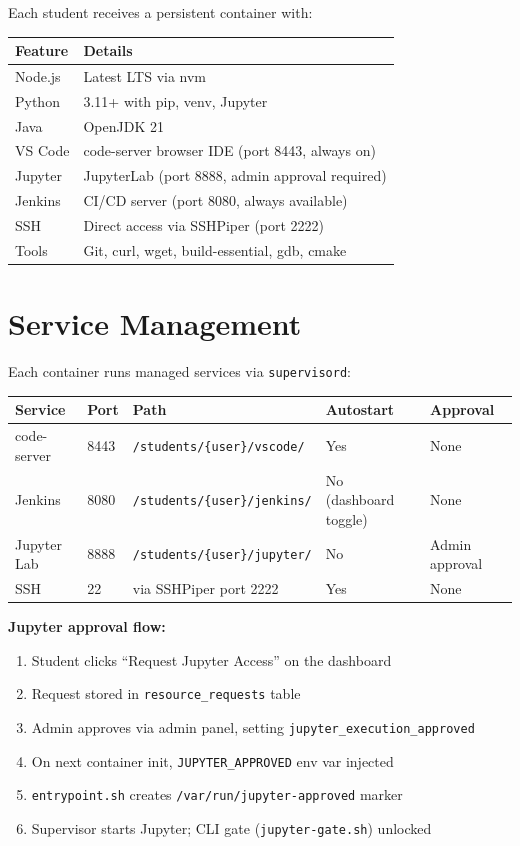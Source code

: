 \documentclass[11pt,a4paper]{article}
\begin{document}
Each student receives a persistent container with:

\begin{table}[H]
\centering
\begin{tabular}{lp{8cm}}
\toprule
\textbf{Feature} & \textbf{Details} \\
\midrule
Node.js & Latest LTS via nvm \\
Python & 3.11+ with pip, venv, Jupyter \\
Java & OpenJDK 21 \\
VS Code & code-server browser IDE (port 8443, always on) \\
Jupyter & JupyterLab (port 8888, admin approval required) \\
Jenkins & CI/CD server (port 8080, always available) \\
SSH & Direct access via SSHPiper (port 2222) \\
Tools & Git, curl, wget, build-essential, gdb, cmake \\
\bottomrule
\end{tabular}
\end{table}

\section{Service Management}

Each container runs managed services via \texttt{supervisord}:

\begin{table}[H]
\centering
\begin{tabular}{llllp{4cm}}
\toprule
\textbf{Service} & \textbf{Port} & \textbf{Path} & \textbf{Autostart} & \textbf{Approval} \\
\midrule
code-server & 8443 & \texttt{/students/\{user\}/vscode/} & Yes & None \\
Jenkins & 8080 & \texttt{/students/\{user\}/jenkins/} & No (dashboard toggle) & None \\
Jupyter Lab & 8888 & \texttt{/students/\{user\}/jupyter/} & No & Admin approval \\
SSH & 22 & via SSHPiper port 2222 & Yes & None \\
\bottomrule
\end{tabular}
\end{table}

\textbf{Jupyter approval flow:}
\begin{enumerate}[nosep]
    \item Student clicks ``Request Jupyter Access'' on the dashboard
    \item Request stored in \texttt{resource\_requests} table
    \item Admin approves via admin panel, setting \texttt{jupyter\_execution\_approved}
    \item On next container init, \texttt{JUPYTER\_APPROVED} env var injected
    \item \texttt{entrypoint.sh} creates \texttt{/var/run/jupyter-approved} marker
    \item Supervisor starts Jupyter; CLI gate (\texttt{jupyter-gate.sh}) unlocked
\end{enumerate}
\end{document}
